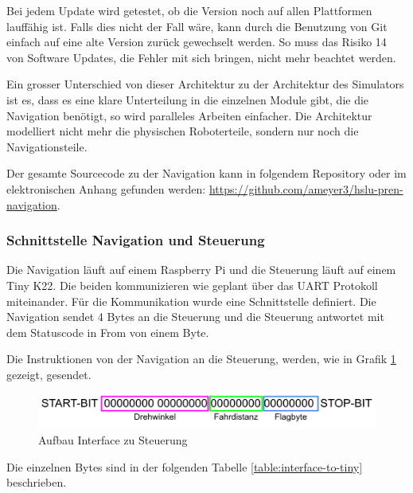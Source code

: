 Bei jedem Update wird getestet, ob die Version noch auf allen Plattformen lauffähig ist. Falls dies nicht der Fall wäre, kann durch die Benutzung von Git einfach auf eine alte Version zurück gewechselt werden. So muss das Risiko 14 von Software Updates, die Fehler mit sich bringen, nicht mehr beachtet werden.


Ein grosser Unterschied von dieser Architektur zu der Architektur des Simulators ist es, dass es eine klare Unterteilung in die einzelnen Module gibt, die die Navigation benötigt, so wird paralleles Arbeiten einfacher. Die Architektur modelliert nicht mehr die physischen Roboterteile, sondern nur noch die Navigationsteile.

Der gesamte Sourcecode zu der Navigation kann in folgendem Repository oder im elektronischen Anhang gefunden werden: \url{https://github.com/ameyer3/hslu-pren-navigation}.


\subsubsection{Schnittstelle Navigation und Steuerung}

Die Navigation läuft auf einem Raspberry Pi und die Steuerung läuft auf einem Tiny K22. Die beiden kommunizieren wie geplant über das UART Protokoll miteinander. Für die Kommunikation wurde eine Schnittstelle definiert. Die Navigation sendet 4 Bytes an die Steuerung und die Steuerung antwortet mit dem Statuscode in From von einem Byte.

Die Instruktionen von der Navigation an die Steuerung, werden, wie in Grafik \ref{fig:interface-tiny} gezeigt, gesendet.

\begin{figure}[H]
\centering
\includegraphics[width=\textwidth]{assets/IT/interface-tiny.png}
\caption{Aufbau Interface zu Steuerung}
\label{fig:interface-tiny}
\end{figure}

Die einzelnen Bytes sind in der folgenden Tabelle \ref{table:interface-to-tiny} beschrieben.

